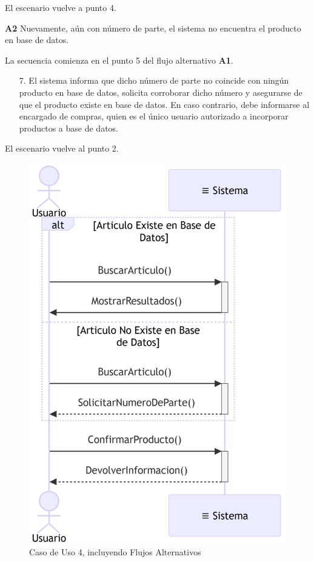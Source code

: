 El escenario vuelve a punto 4.

\textbf{A2} Nuevamente, aún con número de parte, el sistema no encuentra el producto en base de datos.

La secuencia comienza en el punto 5 del flujo alternativo \textbf{A1}.

\begin{enumerate}
	\item [7.] El sistema informa que dicho número de parte no coincide con ningún producto en base de datos, 
	solicita corroborar dicho número y asegurarse de que el producto existe en base de datos.
	En caso contrario, debe informarse al encargado de compras, quien es el único usuario autorizado a incorporar productos a base de datos.
\end{enumerate}

El escenario vuelve al punto 2.

\begin{figure}[H]
	\centering
	\vspace{15pt}
	\caption{Caso de Uso 4, incluyendo Flujos Alternativos}
	\vspace{15pt}
	\includegraphics[width=.7\textwidth]{img/04-diagrama-caso-4.png}
	\vspace{15pt}
\end{figure}


